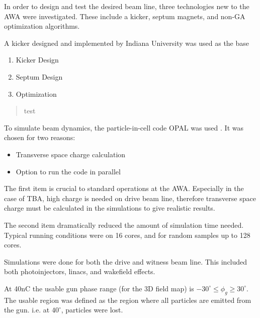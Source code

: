 \documentclass{iitthesis}
\begin{document}
In order to design and test the desired beam line, three technologies 
new to the AWA were investigated. These include a kicker, septum magnets, 
and non-GA optimization algorithms.


A kicker designed and implemented by Indiana University \cite{IU} was used as the base 

\begin{enumerate}
	\item Kicker Design
	\item Septum Design
	\item Optimization 
\end{enumerate}

\begin{quotation}
	test
\end{quotation}

\clearpage


\label{sec:code}

To simulate beam dynamics, the particle-in-cell code OPAL was used \cite{opal}. 
It was chosen for two reasons:
\begin{itemize}
	\item Transverse space charge calculation 
	\item Option to run the code in parallel
\end{itemize} 

The first item is crucial to standard operations at the AWA. Especially in the 
case of TBA, high charge is needed on drive beam line, therefore transverse 
space charge must be calculated in the simulations to give realistic results.

The second item dramatically reduced the amount of simulation time needed. 
Typical running conditions were on 16 cores, and for random samples up to 128 cores.

 \label{sec:opt}

 \label{sec:simulations}
Simulations were done for both the drive and witness beam line. 
This included both photoinjectors, linacs, and wakefield effects. 

At 40nC the usable gun phase range (for the 3D field map) is 
$-30^\circ \le \phi_g \ge 30^\circ$. The usable region was defined 
as the region where all particles are emitted from the gun. 
i.e. at $40^\circ$, particles were lost.  
\end{document}
